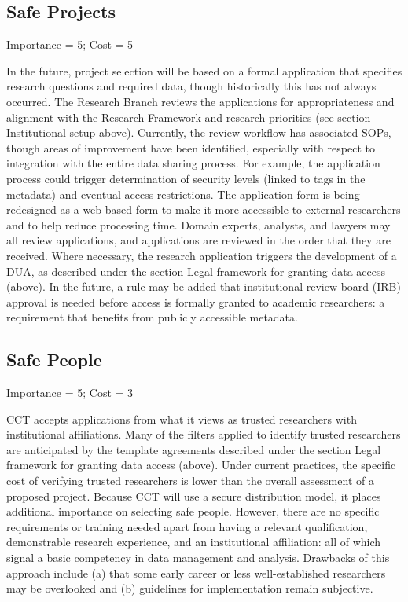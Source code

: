 \documentclass[
]{book}
\begin{document}
\hypertarget{safe-projects-6}{%
\subsection{Safe Projects}\label{safe-projects-6}}

Importance = 5; Cost = 5

In the future, project selection will be based on a formal application that specifies research questions and required data, though historically this has not always occurred. The Research Branch reviews the applications for appropriateness and alignment with the \href{http://osf.io/2a7ev}{Research Framework and research priorities} (see section Institutional setup above). Currently, the review workflow has associated SOPs, though areas of improvement have been identified, especially with respect to integration with the entire data sharing process. For example, the application process could trigger determination of security levels (linked to tags in the metadata) and eventual access restrictions. The application form is being redesigned as a web-based form to make it more accessible to external researchers and to help reduce processing time. Domain experts, analysts, and lawyers may all review applications, and applications are reviewed in the order that they are received. Where necessary, the research application triggers the development of a DUA, as described under the section Legal framework for granting data access (above). In the future, a rule may be added that institutional review board (IRB) approval is needed before access is formally granted to academic researchers: a requirement that benefits from publicly accessible metadata.

\hypertarget{safe-people-6}{%
\subsection{Safe People}\label{safe-people-6}}

Importance = 5; Cost = 3

CCT accepts applications from what it views as trusted researchers with institutional affiliations. Many of the filters applied to identify trusted researchers are anticipated by the template agreements described under the section Legal framework for granting data access (above). Under current practices, the specific cost of verifying trusted researchers is lower than the overall assessment of a proposed project. Because CCT will use a secure distribution model, it places additional importance on selecting safe people. However, there are no specific requirements or training needed apart from having a relevant qualification, demonstrable research experience, and an institutional affiliation: all of which signal a basic competency in data management and analysis. Drawbacks of this approach include (a) that some early career or less well-established researchers may be overlooked and (b) guidelines for implementation remain subjective.
\end{document}
